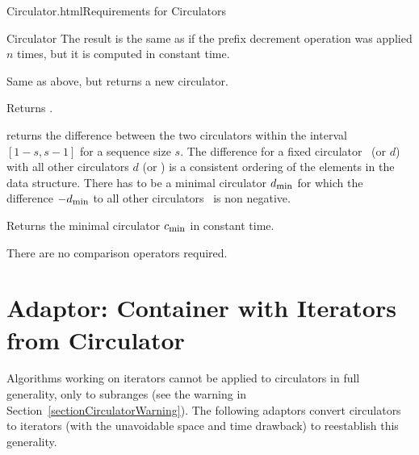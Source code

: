 \begin{ccHtmlClassFile}{Circulator.html}{Requirements for Circulators}
\begin{ccClass}{Circulator}
{The result is the same as if the prefix decrement operation 
 was applied $n$ times, but it is computed in constant time.}

{Same as above, but returns a new circulator.}


{Returns .}

{returns the difference between the two circulators within the
  interval $\left[ 1-s , s-1 \right]$ for a sequence size $s$. The
  difference for a fixed circulator \ccVar\ (or $d$) with all other
  circulators $d$ (or \ccVar) is a consistent ordering of the elements
  in the data structure. There has to be a minimal circulator
  $d_{\mbox{\footnotesize min}}$ for which the difference \ccVar $-
  d_{\mbox{\footnotesize min}}$ to all other circulators \ccVar\ is
  non negative.}

{Returns the minimal circulator $c_{\mbox{\footnotesize min}}$ in
  constant time.} 

There are no comparison operators required.
\end{ccClass} 
\end{ccHtmlClassFile} 

\newpage
\section{Adaptor: Container with Iterators from Circulator}
\label{sectionContainerFromCirc}

Algorithms working on iterators cannot be applied to circulators in
full generality, only to subranges (see the warning in
Section~\ref{sectionCirculatorWarning}). The following adaptors
convert circulators to iterators (with the unavoidable space and time
drawback) to reestablish this generality.

